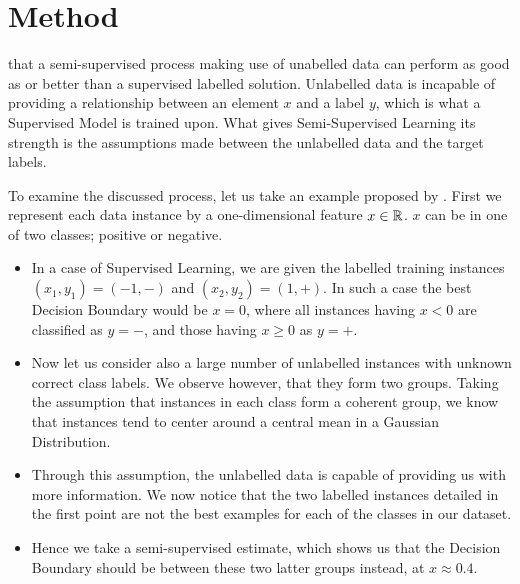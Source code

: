 \section{Method}\label{sec:method}

 that a semi-supervised process making use of unabelled data can perform as good as or better than a supervised labelled solution. Unlabelled data is incapable of providing a relationship between an element $x$ and a label $y$, which is what a Supervised Model is trained upon. What gives Semi-Supervised Learning its strength is the assumptions made between the unlabelled data and the target labels.

To examine the discussed process, let us take an example proposed by \citet{zhu2009introduction}. First we represent each data instance by a one-dimensional feature $ x \in\mathbb{R}$. $x$ can be in one of two classes; positive or negative.

\begin{itemize}
\item In a case of Supervised Learning, we are given the labelled training instances $(x_1,y_1) = (-1, -)$ and $(x_2, y_2) = (1,+)$. In such a case the best Decision Boundary would be $x = 0$, where all instances having $x < 0$ are classified as $y = -$, and those having $x \geq 0$ as $y=+$.
\item Now let us consider also a large number of unlabelled instances with unknown correct class labels. We observe however, that they form two groups. Taking the assumption that instances in each class form a coherent group, we know that instances tend to center around a central mean in a Gaussian Distribution. 
\item Through this assumption, the unlabelled data is capable of providing us with more information. We now notice that the two labelled instances detailed in the first point are not the best examples for each of the classes in our dataset.
\item Hence we take a semi-supervised estimate, which shows us that the Decision Boundary should be between these two latter groups instead, at $x \approx 0.4$.
\end{itemize}

